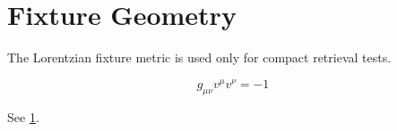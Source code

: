 \section{Fixture Geometry}\label{sec:fixture}

The Lorentzian fixture metric is used only for compact retrieval tests.

\begin{equation}
g_{\mu\nu}v^\mu v^\nu = -1
\end{equation}

See \ref{sec:fixture}.
